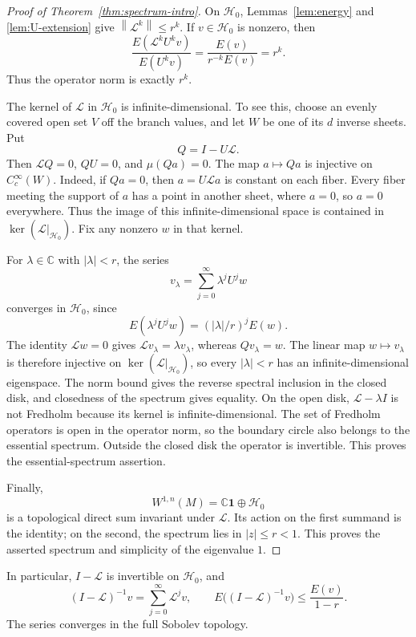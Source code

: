 \documentclass[11pt,reqno]{amsart}
\theoremstyle{plain}
\theoremstyle{definition}
\theoremstyle{remark}
\newcommand{\C}{\mathbb C}
\newcommand{\Lop}{\mathcal L}
\newcommand{\Hcal}{\mathcal H}
\newcommand{\norm}[1]{\left\lVert #1\right\rVert}
\numberwithin{equation}{section}
\begin{document}
\begin{proof}[Proof of Theorem~\ref{thm:spectrum-intro}]
On $\Hcal_0$, Lemmas~\ref{lem:energy} and \ref{lem:U-extension} give $\norm{\Lop^k}\le r^k$. If $v\in\Hcal_0$ is nonzero, then
\[
 \frac{E(\Lop^kU^kv)}{E(U^kv)}
 =\frac{E(v)}{r^{-k}E(v)}=r^k.
\]
Thus the operator norm is exactly $r^k$.

The kernel of $\Lop$ in $\Hcal_0$ is infinite-dimensional. To see this, choose an evenly covered open set $V$ off the branch values, and let $W$ be one of its $d$ inverse sheets. Put
\[
 Q=I-U\Lop.
\]
Then $\Lop Q=0$, $QU=0$, and $\mu(Qa)=0$. The map $a\mapsto Qa$ is injective on $C_c^\infty(W)$. Indeed, if $Qa=0$, then $a=U\Lop a$ is constant on each fiber. Every fiber meeting the support of $a$ has a point in another sheet, where $a=0$, so $a=0$ everywhere. Thus the image of this infinite-dimensional space is contained in $\ker(\Lop|_{\Hcal_0})$. Fix any nonzero $w$ in that kernel.

For $\lambda\in\C$ with $|\lambda|<r$, the series
\begin{equation}\label{eq:eigenvector-series}
 v_\lambda=\sum_{j=0}^{\infty}\lambda^jU^jw
\end{equation}
converges in $\Hcal_0$, since
\[
 E(\lambda^jU^jw)=(|\lambda|/r)^jE(w).
\]
The identity $\Lop w=0$ gives $\Lop v_\lambda=\lambda v_\lambda$, whereas $Qv_\lambda=w$. The linear map $w\mapsto v_\lambda$ is therefore injective on $\ker(\Lop|_{\Hcal_0})$, so every $|\lambda|<r$ has an infinite-dimensional eigenspace. The norm bound gives the reverse spectral inclusion in the closed disk, and closedness of the spectrum gives equality. On the open disk, $\Lop-\lambda I$ is not Fredholm because its kernel is infinite-dimensional. The set of Fredholm operators is open in the operator norm, so the boundary circle also belongs to the essential spectrum. Outside the closed disk the operator is invertible. This proves the essential-spectrum assertion.

Finally,
\[
 W^{1,n}(M)=\C\mathbf1\oplus\Hcal_0
\]
is a topological direct sum invariant under $\Lop$. Its action on the first summand is the identity; on the second, the spectrum lies in $|z|\le r<1$. This proves the asserted spectrum and simplicity of the eigenvalue $1$.
\end{proof}

In particular, $I-\Lop$ is invertible on $\Hcal_0$, and
\begin{equation}\label{eq:resolvent}
 (I-\Lop)^{-1}v=\sum_{j=0}^{\infty}\Lop^jv,
 \qquad
 E\big((I-\Lop)^{-1}v\big)\le\frac{E(v)}{1-r}.
\end{equation}
The series converges in the full Sobolev topology.
\end{document}
